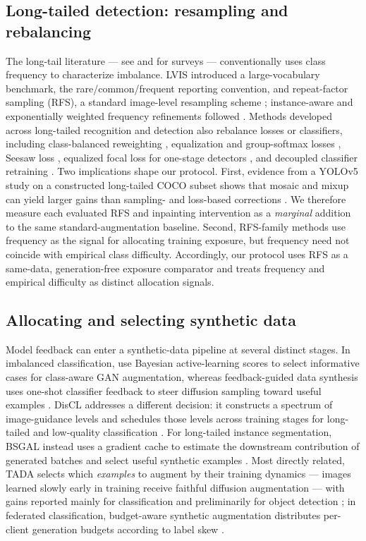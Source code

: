 \documentclass[preprint,12pt,authoryear]{elsarticle}
\begin{document}
\subsection{Long-tailed detection: resampling and rebalancing}
The long-tail literature --- see \citet{oksuz2021imbalance} and
\citet{zhang2023longtail} for surveys --- conventionally uses class
frequency to characterize imbalance. LVIS introduced a large-vocabulary
benchmark, the rare/common/frequent reporting convention, and
repeat-factor sampling (RFS), a standard image-level resampling scheme
\citep{gupta2019lvis}; instance-aware and exponentially weighted
frequency refinements followed \citep{yaman2023irfs,ahmed2025eirfs}.
Methods developed across long-tailed recognition and detection also
rebalance losses or classifiers, including class-balanced reweighting
\citep{cui2019classbalanced}, equalization and group-softmax losses
\citep{tan2020equalization,li2020bags}, Seesaw loss
\citep{wang2021seesaw}, equalized focal loss for one-stage detectors
\citep{li2022efl}, and decoupled classifier retraining
\citep{kang2020decoupling}. Two implications shape our protocol. First,
evidence from a YOLOv5 study on a constructed long-tailed COCO subset
shows that mosaic and mixup can yield larger gains than sampling- and
loss-based corrections \citep{crasto2024imbalance}. We therefore measure
each evaluated RFS and inpainting intervention as a \emph{marginal}
addition to the same standard-augmentation baseline. Second, RFS-family
methods use frequency
as the signal for allocating training exposure, but frequency need not
coincide with empirical class difficulty. Accordingly, our protocol uses
RFS as a same-data, generation-free exposure comparator and treats
frequency
and empirical difficulty as distinct allocation signals.

\subsection{Allocating and selecting synthetic data}
Model feedback can enter a synthetic-data pipeline at several distinct
stages. In imbalanced classification, \citet{bozorgtabar2019informative}
use Bayesian active-learning scores to select informative cases for
class-aware GAN augmentation, whereas feedback-guided data synthesis uses
one-shot classifier feedback to steer diffusion sampling toward useful
examples \citep{hemmat2024feedback}. DisCL addresses a different decision:
it constructs a spectrum of image-guidance levels and schedules those
levels across training stages for long-tailed and low-quality
classification \citep{liang2025discl}. For long-tailed instance
segmentation, BSGAL instead uses a gradient cache to estimate the
downstream contribution of generated batches and select useful synthetic
examples \citep{zhu2024bsgal}. Most directly related, TADA selects
which \emph{examples} to augment by their training dynamics --- images
learned slowly early in training receive faithful diffusion
augmentation --- with gains reported mainly for classification and
preliminarily for object detection \citep{nguyen2026tada}; in
federated classification, budget-aware synthetic augmentation
distributes per-client generation budgets according to label skew
\citep{lee2026fedeas}.
\end{document}

